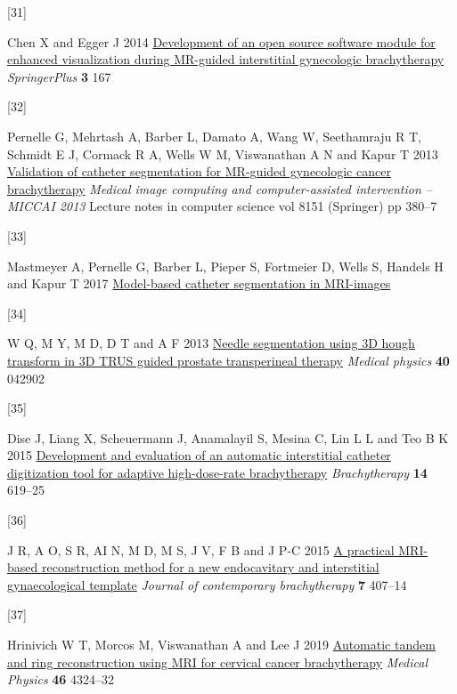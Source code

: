 \documentclass[
  11pt,
]{article}
\newlength{\cslhangindent}
\newlength{\csllabelwidth}
\newenvironment{CSLReferences}[2] %
 {\begin{list}{}{%
  \setlength{\itemindent}{0pt}
  \setlength{\leftmargin}{0pt}
  \setlength{\parsep}{0pt}
  \ifodd #1
   \setlength{\leftmargin}{\cslhangindent}
   \setlength{\itemindent}{-1\cslhangindent}
  \fi
  \setlength{\itemsep}{#2\baselineskip}}}
 {\end{list}}
\newcommand{\CSLLeftMargin}[1]{\parbox[t]{\csllabelwidth}{\strut#1\strut}}
\newcommand{\CSLRightInline}[1]{\parbox[t]{\linewidth - \csllabelwidth}{\strut#1\strut}}
\begin{document}
\begin{CSLReferences}{0}{1}
\CSLLeftMargin{{[}31{]} }%
\CSLRightInline{Chen X and Egger J 2014
\href{https://doi.org/10.1186/2193-1801-3-167}{Development of an open
source software module for enhanced visualization during MR-guided
interstitial gynecologic brachytherapy} \emph{SpringerPlus} \textbf{3}
167}

\CSLLeftMargin{{[}32{]} }%
\CSLRightInline{Pernelle G, Mehrtash A, Barber L, Damato A, Wang W,
Seethamraju R T, Schmidt E J, Cormack R A, Wells W M, Viswanathan A N
and Kapur T 2013
\href{https://doi.org/10.1007/978-3-642-40760-4_48}{Validation of
catheter segmentation for {MR}-guided gynecologic cancer brachytherapy}
\emph{Medical image computing and computer-assisted intervention --
MICCAI 2013} Lecture notes in computer science vol 8151 (Springer) pp
380--7}

\CSLLeftMargin{{[}33{]} }%
\CSLRightInline{Mastmeyer A, Pernelle G, Barber L, Pieper S, Fortmeier
D, Wells S, Handels H and Kapur T 2017
\href{https://arxiv.org/abs/1705.06712}{Model-based catheter
segmentation in MRI-images}}

\CSLLeftMargin{{[}34{]} }%
\CSLRightInline{W Q, M Y, M D, D T and A F 2013
\href{https://doi.org/10.1118/1.4795337}{Needle segmentation using 3D
hough transform in 3D TRUS guided prostate transperineal therapy}
\emph{Medical physics} \textbf{40} 042902}

\CSLLeftMargin{{[}35{]} }%
\CSLRightInline{Dise J, Liang X, Scheuermann J, Anamalayil S, Mesina C,
Lin L L and Teo B K 2015
\href{https://doi.org/10.1016/j.brachy.2015.05.004}{Development and
evaluation of an automatic interstitial catheter digitization tool for
adaptive high-dose-rate brachytherapy} \emph{Brachytherapy} \textbf{14}
619--25}

\CSLLeftMargin{{[}36{]} }%
\CSLRightInline{J R, A O, S R, AI N, M D, M S, J V, F B and J P-C 2015
\href{https://doi.org/10.5114/jcb.2015.55340}{A practical MRI-based
reconstruction method for a new endocavitary and interstitial
gynaecological template} \emph{Journal of contemporary brachytherapy}
\textbf{7} 407--14}

\CSLLeftMargin{{[}37{]} }%
\CSLRightInline{Hrinivich W T, Morcos M, Viswanathan A and Lee J 2019
\href{https://doi.org/10.1002/mp.13730}{Automatic tandem and ring
reconstruction using {MRI} for cervical cancer brachytherapy}
\emph{Medical Physics} \textbf{46} 4324--32}


\end{CSLReferences}
\end{document}
